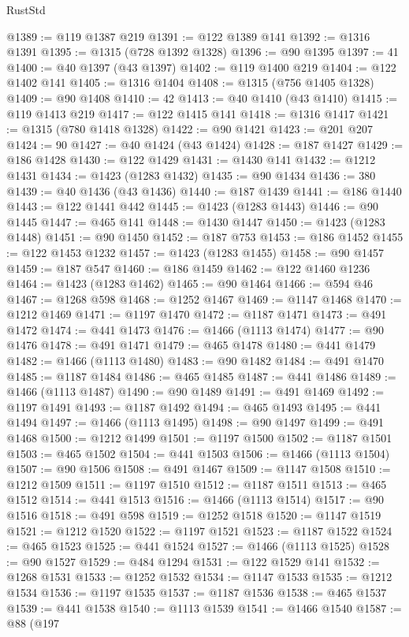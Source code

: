 \begin{lexlean}{RustStd}
\begin{coremodule}
@1389 := @119 @1387 @219
@1391 := @122 @1389 @141
@1392 := @1316 @1391
@1395 := @1315 (@728 @1392 @1328)
@1396 := @90 @1395
@1397 := 41
@1400 := @40 @1397 (@43 @1397)
@1402 := @119 @1400 @219
@1404 := @122 @1402 @141
@1405 := @1316 @1404
@1408 := @1315 (@756 @1405 @1328)
@1409 := @90 @1408
@1410 := 42
@1413 := @40 @1410 (@43 @1410)
@1415 := @119 @1413 @219
@1417 := @122 @1415 @141
@1418 := @1316 @1417
@1421 := @1315 (@780 @1418 @1328)
@1422 := @90 @1421
@1423 := @201 @207
@1424 := 90
@1427 := @40 @1424 (@43 @1424)
@1428 := @187 @1427
@1429 := @186 @1428
@1430 := @122 @1429
@1431 := @1430 @141
@1432 := @1212 @1431
@1434 := @1423 (@1283 @1432)
@1435 := @90 @1434
@1436 := 380
@1439 := @40 @1436 (@43 @1436)
@1440 := @187 @1439
@1441 := @186 @1440
@1443 := @122 @1441 @442
@1445 := @1423 (@1283 @1443)
@1446 := @90 @1445
@1447 := @465 @141
@1448 := @1430 @1447
@1450 := @1423 (@1283 @1448)
@1451 := @90 @1450
@1452 := @187 @753
@1453 := @186 @1452
@1455 := @122 @1453 @1232
@1457 := @1423 (@1283 @1455)
@1458 := @90 @1457
@1459 := @187 @547
@1460 := @186 @1459
@1462 := @122 @1460 @1236
@1464 := @1423 (@1283 @1462)
@1465 := @90 @1464
@1466 := @594 @46
@1467 := @1268 @598
@1468 := @1252 @1467
@1469 := @1147 @1468
@1470 := @1212 @1469
@1471 := @1197 @1470
@1472 := @1187 @1471
@1473 := @491 @1472
@1474 := @441 @1473
@1476 := @1466 (@1113 @1474)
@1477 := @90 @1476
@1478 := @491 @1471
@1479 := @465 @1478
@1480 := @441 @1479
@1482 := @1466 (@1113 @1480)
@1483 := @90 @1482
@1484 := @491 @1470
@1485 := @1187 @1484
@1486 := @465 @1485
@1487 := @441 @1486
@1489 := @1466 (@1113 @1487)
@1490 := @90 @1489
@1491 := @491 @1469
@1492 := @1197 @1491
@1493 := @1187 @1492
@1494 := @465 @1493
@1495 := @441 @1494
@1497 := @1466 (@1113 @1495)
@1498 := @90 @1497
@1499 := @491 @1468
@1500 := @1212 @1499
@1501 := @1197 @1500
@1502 := @1187 @1501
@1503 := @465 @1502
@1504 := @441 @1503
@1506 := @1466 (@1113 @1504)
@1507 := @90 @1506
@1508 := @491 @1467
@1509 := @1147 @1508
@1510 := @1212 @1509
@1511 := @1197 @1510
@1512 := @1187 @1511
@1513 := @465 @1512
@1514 := @441 @1513
@1516 := @1466 (@1113 @1514)
@1517 := @90 @1516
@1518 := @491 @598
@1519 := @1252 @1518
@1520 := @1147 @1519
@1521 := @1212 @1520
@1522 := @1197 @1521
@1523 := @1187 @1522
@1524 := @465 @1523
@1525 := @441 @1524
@1527 := @1466 (@1113 @1525)
@1528 := @90 @1527
@1529 := @484 @1294
@1531 := @122 @1529 @141
@1532 := @1268 @1531
@1533 := @1252 @1532
@1534 := @1147 @1533
@1535 := @1212 @1534
@1536 := @1197 @1535
@1537 := @1187 @1536
@1538 := @465 @1537
@1539 := @441 @1538
@1540 := @1113 @1539
@1541 := @1466 @1540
@1587 := @88
    (@197

\end{coremodule}
\end{lexlean}
